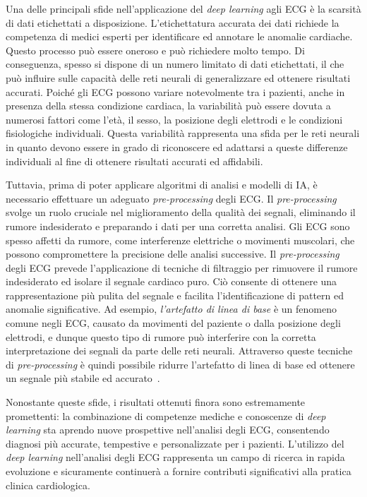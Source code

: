 Una delle principali sfide nell'applicazione del \textit{deep learning} agli ECG è la scarsità di dati etichettati a disposizione. L'etichettatura accurata dei dati richiede la competenza di medici esperti per identificare ed annotare le anomalie cardiache. Questo processo può essere oneroso e può richiedere molto tempo. Di conseguenza, spesso si dispone di un numero limitato di dati etichettati, il che può influire sulle capacità delle reti neurali di generalizzare ed ottenere risultati accurati. Poiché gli ECG possono variare notevolmente tra i pazienti, anche in presenza della stessa condizione cardiaca, la variabilità può essere dovuta a numerosi fattori come l'età, il sesso, la posizione degli elettrodi e le condizioni fisiologiche individuali. Questa variabilità rappresenta una sfida per le reti neurali in quanto devono essere in grado di riconoscere ed adattarsi a queste differenze individuali al fine di ottenere risultati accurati ed affidabili.

Tuttavia, prima di poter applicare algoritmi di analisi e modelli di IA, è necessario effettuare un adeguato \textit{pre-processing} degli ECG. Il \textit{pre-processing} svolge un ruolo cruciale nel miglioramento della qualità dei segnali, eliminando il rumore indesiderato e preparando i dati per una corretta analisi. Gli ECG sono spesso affetti da rumore, come interferenze elettriche o movimenti muscolari, che possono compromettere la precisione delle analisi successive. Il \textit{pre-processing} degli ECG prevede l'applicazione di tecniche di filtraggio per rimuovere il rumore indesiderato ed isolare il segnale cardiaco puro. Ciò consente di ottenere una rappresentazione più pulita del segnale e facilita l'identificazione di pattern ed anomalie significative. Ad esempio, \textit{l'artefatto di linea di base} è un fenomeno comune negli ECG, causato da movimenti del paziente o dalla posizione degli elettrodi, e dunque questo tipo di rumore può interferire con la corretta interpretazione dei segnali da parte delle reti neurali. Attraverso queste tecniche di \textit{pre-processing} è quindi possibile ridurre l'artefatto di linea di base ed ottenere un segnale più stabile ed accurato~\cite{use}.

Nonostante queste sfide, i risultati ottenuti finora sono estremamente promettenti: la combinazione di competenze mediche e conoscenze di \textit{deep learning} sta aprendo nuove prospettive nell'analisi degli ECG, consentendo diagnosi più accurate, tempestive e personalizzate per i pazienti. L'utilizzo del \textit{deep learning} nell'analisi degli ECG rappresenta un campo di ricerca in rapida evoluzione e sicuramente continuerà a fornire contributi significativi alla pratica clinica cardiologica.

